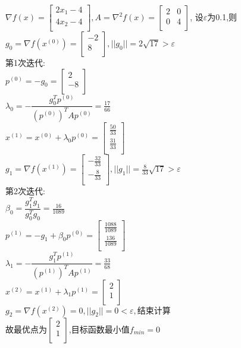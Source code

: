 \begin{solution}
    $\nabla f(x)=\begin{bmatrix}
        2x_1-4  \\
        4x_2-4  \\
    \end{bmatrix}, A=\nabla^2 f(x)=\begin{bmatrix}
        2  & 0  \\
        0  & 4  \\
    \end{bmatrix}$,
    设$\varepsilon$为0.1,则\\
    $g_0=\nabla f(x^{(0)})=\begin{bmatrix} -2\\8\\\end{bmatrix},||g_0||=2\sqrt{17}>\varepsilon$\\
    第1次迭代:\\
    $p^{(0)}=-g_0=\begin{bmatrix} 2\\-8\\\end{bmatrix}$\\
    $\lambda_0=-\dfrac{g_0^Tp^{(0)}}{(p^{(0)})^TAp^{(0)}}=\frac{17}{66}$\\
    $x^{(1)}=x^{(0)}+\lambda_0p^{(0)}=\begin{bmatrix} \frac{50}{33}\\\frac{31}{33}\\\end{bmatrix}$\\
    $g_1=\nabla f(x^{(1)})=\begin{bmatrix} -\frac{32}{33}\\-\frac{8}{33}\\\end{bmatrix},||g_1||=\frac{8}{33}\sqrt{17}>\varepsilon$\\
    第2次迭代:\\
    $\beta_0=\dfrac{g_1^Tg_1}{g_0^Tg_0}=\frac{16}{1089}$\\
    $p^{(1)}=-g_1+\beta_0p^{(0)}=\begin{bmatrix} \frac{1088}{1089}\\\frac{136}{1089}\\\end{bmatrix}$\\
    $\lambda_1=-\dfrac{g_1^Tp^{(1)}}{(p^{(1)})^TAp^{(1)}}=\frac{33}{68}$\\
    $x^{(2)}=x^{(1)}+\lambda_1p^{(1)}=\begin{bmatrix} 2\\1\\\end{bmatrix}$\\
    $g_2=\nabla f(x^{(2)})=0,||g_2||=0<\varepsilon,\text{结束计算}$\\
    故最优点为$\begin{bmatrix} 2\\1\\\end{bmatrix}$,目标函数最小值$f_{min}=0$
\end{solution}

